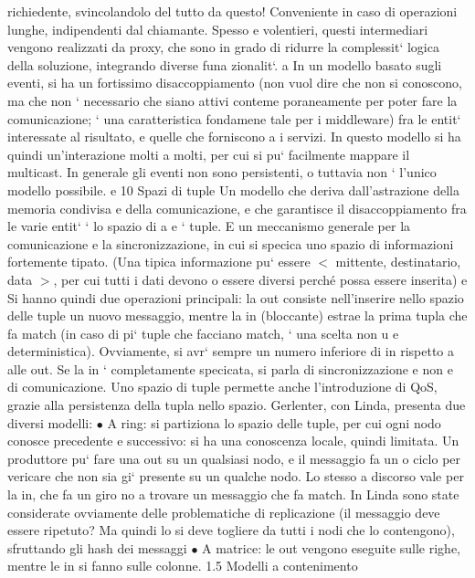 \documentclass[a4paper,12pt]{article}
\begin{document}
richiedente, svincolandolo del tutto da questo! Conveniente in caso di
operazioni lunghe, indipendenti dal chiamante.
Spesso e volentieri, questi intermediari vengono realizzati da proxy, che sono in
grado di ridurre la complessit` logica della soluzione, integrando diverse funa
zionalit`.
a
In un modello basato sugli eventi, si ha un fortissimo disaccoppiamento (non
vuol dire che non si conoscono, ma che non ` necessario che siano attivi conteme
poraneamente per poter fare la comunicazione; ` una caratteristica fondamene
tale per i middleware) fra le entit` interessate al risultato, e quelle che forniscono
a
i servizi. In questo modello si ha quindi un'interazione molti a molti, per cui si
pu` facilmente mappare il multicast. In generale gli eventi non sono persistenti,
o
tuttavia non ` l'unico modello possibile.
e
10
Spazi di tuple
Un modello che deriva dall'astrazione della memoria condivisa e della comunicazione, e che garantisce il
disaccoppiamento fra le varie entit` ` lo spazio di
a e
`
tuple. E un meccanismo generale per la comunicazione e la sincronizzazione, in
cui si specica uno spazio di informazioni fortemente tipato. (Una tipica informazione pu` essere $<$ mittente,
destinatario, data $>$, per cui tutti i dati devono
o
essere diversi perché possa essere inserita)
e
Si hanno quindi due operazioni principali: la out consiste nell'inserire nello
spazio delle tuple un nuovo messaggio, mentre la in (bloccante) estrae la prima
tupla che fa match (in caso di pi` tuple che facciano match, ` una scelta non
u
e
deterministica). Ovviamente, si avr` sempre un numero inferiore di in rispetto
a
alle out. Se la in ` completamente specicata, si parla di sincronizzazione e non
e
di comunicazione. Uno spazio di tuple permette anche l'introduzione di QoS,
grazie alla persistenza della tupla nello spazio.
Gerlenter, con Linda, presenta due diversi modelli:
$\bullet$ A ring: si partiziona lo spazio delle tuple, per cui ogni nodo conosce
precedente e successivo: si ha una conoscenza locale, quindi limitata. Un
produttore pu` fare una out su un qualsiasi nodo, e il messaggio fa un
o
ciclo per vericare che non sia gi` presente su un qualche nodo. Lo stesso
a
discorso vale per la in, che fa un giro no a trovare un messaggio che fa
match. In Linda sono state considerate ovviamente delle problematiche
di replicazione (il messaggio deve essere ripetuto? Ma quindi lo si deve
togliere da tutti i nodi che lo contengono), sfruttando gli hash dei messaggi
$\bullet$ A matrice: le out vengono eseguite sulle righe, mentre le in si fanno sulle
colonne.
1.5
Modelli a contenimento
\end{document}
